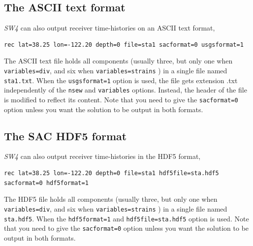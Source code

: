 \documentclass[11pt]{report}
\begin{document}
\subsection{The ASCII text format}
\emph{SW4} can also output receiver time-histories on an ASCII text format,
\begin{verbatim}
rec lat=38.25 lon=-122.20 depth=0 file=sta1 sacformat=0 usgsformat=1
\end{verbatim}
The ASCII text file holds all components (usually three, but only one when {\tt
  variables=div}, and six when {\tt variables=strains} ) in a single file named {\tt sta1.txt}. When
the \verb+usgsformat=1+ option is used, the file gets extension .txt independently of the
\verb+nsew+ and \verb+variables+ options.  Instead, the header of the file is modified to reflect
its content. Note that you need to give the \verb+sacformat=0+ option unless you want the solution
to be output in both formats.

\subsection{The SAC HDF5 format}
\emph{SW4} can also output receiver time-histories in the HDF5 format,
\begin{verbatim}
rec lat=38.25 lon=-122.20 depth=0 file=sta1 hdf5file=sta.hdf5 sacformat=0 hdf5format=1
\end{verbatim}
The HDF5 file holds all components (usually three, but only one when {\tt
  variables=div}, and six when {\tt variables=strains} ) in a single file named {\tt sta.hdf5}. When
the \verb+hdf5format=1+ and \verb+hdf5file=sta.hdf5+ option is used. 
Note that you need to give the \verb+sacformat=0+ option unless you want the solution
to be output in both formats.
\end{document}
